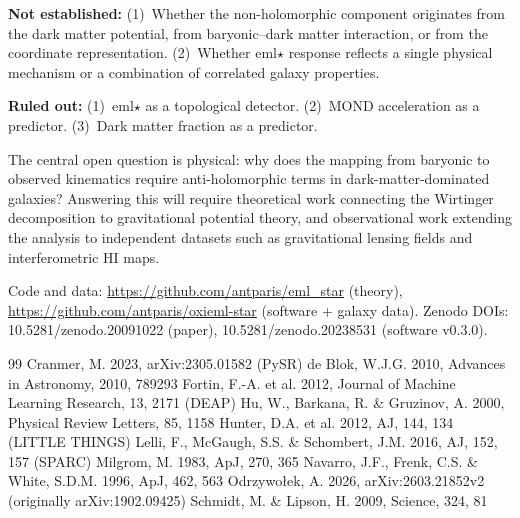 \documentclass[12pt,a4paper]{article}
\begin{document}
\textbf{Not established:} (1)~Whether the non-holomorphic component originates from the dark matter potential, from baryonic--dark matter interaction, or from the coordinate representation. (2)~Whether eml$\star$ response reflects a single physical mechanism or a combination of correlated galaxy properties.

\textbf{Ruled out:} (1)~eml$\star$ as a topological detector. (2)~MOND acceleration as a predictor. (3)~Dark matter fraction as a predictor.

The central open question is physical: why does the mapping from baryonic to observed kinematics require anti-holomorphic terms in dark-matter-dominated galaxies? Answering this will require theoretical work connecting the Wirtinger decomposition to gravitational potential theory, and observational work extending the analysis to independent datasets such as gravitational lensing fields and interferometric HI maps.

Code and data: \url{https://github.com/antparis/eml_star} (theory), \url{https://github.com/antparis/oxieml-star} (software + galaxy data). Zenodo DOIs: 10.5281/zenodo.20091022 (paper), 10.5281/zenodo.20238531 (software v0.3.0).

\begin{thebibliography}{99}
 Cranmer, M. 2023, arXiv:2305.01582 (PySR)
 de Blok, W.J.G. 2010, Advances in Astronomy, 2010, 789293
 Fortin, F.-A. et al. 2012, Journal of Machine Learning Research, 13, 2171 (DEAP)
 Hu, W., Barkana, R. \& Gruzinov, A. 2000, Physical Review Letters, 85, 1158
 Hunter, D.A. et al. 2012, AJ, 144, 134 (LITTLE THINGS)
 Lelli, F., McGaugh, S.S. \& Schombert, J.M. 2016, AJ, 152, 157 (SPARC)
 Milgrom, M. 1983, ApJ, 270, 365
 Navarro, J.F., Frenk, C.S. \& White, S.D.M. 1996, ApJ, 462, 563
 Odrzywo{\l}ek, A. 2026, arXiv:2603.21852v2 (originally arXiv:1902.09425)
 Schmidt, M. \& Lipson, H. 2009, Science, 324, 81
\end{thebibliography}
\end{document}
